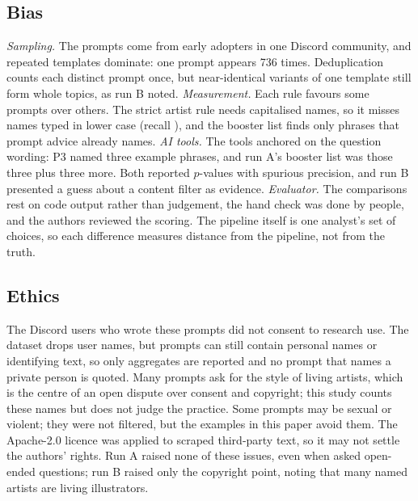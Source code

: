 \documentclass[conference]{IEEEtran}
\begin{document}
\subsection{Bias}
\textit{Sampling.} The prompts come from early adopters in one Discord
community, and repeated templates dominate: one prompt appears 736 times.
Deduplication counts each distinct prompt once, but near-identical
variants of one template still form whole topics, as run B noted.
\textit{Measurement.} Each rule favours some prompts over others. The
strict artist rule needs capitalised names, so it misses names typed in
lower case (recall \ValRecStrict), and the booster list
finds only phrases that prompt advice already names.
\textit{AI tools.} The tools anchored on the question wording: P3 named
three example phrases, and run A's booster list was those three plus
three more.
Both reported $p$-values with spurious precision, and run B presented a
guess about a content filter as evidence.
\textit{Evaluator.} The comparisons rest on code output rather than judgement, the hand check
was done by people, and the authors reviewed the scoring. The pipeline
itself is one analyst's set of choices, so each difference measures
distance from the pipeline, not from the truth.

\subsection{Ethics}
The Discord users who wrote these prompts did not consent to research use.
The dataset drops user names, but prompts can still contain personal names
or identifying text, so only aggregates are reported and no prompt that names a private
person is quoted. Many prompts ask for the style of living artists,
which is the centre of an open dispute over consent and copyright; this study counts these names but does not judge the practice. Some prompts may be
sexual or violent; they were not filtered, but the examples in this paper avoid them.
The Apache-2.0 licence was applied to scraped third-party text, so it may
not settle the authors' rights. Run A raised none of these issues, even
when asked open-ended questions; run B raised only the copyright point,
noting that many named artists are living illustrators.
\end{document}
